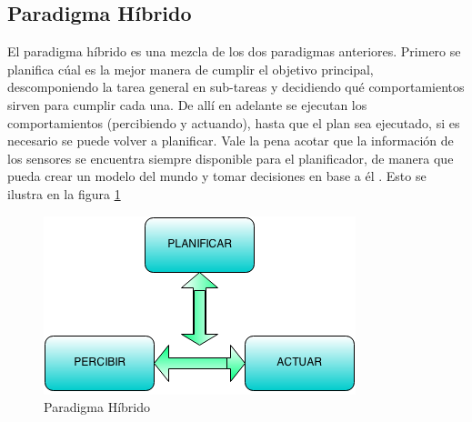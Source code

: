 \subsection{Paradigma Híbrido}
El paradigma híbrido es una mezcla de los dos paradigmas anteriores. Primero se planifica cúal es la mejor manera de cumplir el objetivo principal, descomponiendo la tarea general en sub-tareas y decidiendo qué comportamientos sirven para cumplir cada una. De allí en adelante se ejecutan los comportamientos (percibiendo y actuando), hasta que el plan sea ejecutado, si es necesario se puede volver a planificar. Vale la pena acotar que la información de los sensores se encuentra siempre disponible para el planificador, de manera que pueda crear un modelo del mundo y tomar decisiones en base a él  \cite{AiRobotics}. Esto se ilustra en la figura \ref{fig:hibrido}
\begin{figure}[hbtp]

\centering
\includegraphics[scale=0.7]{imagenes/hibrido.png} 
\caption{Paradigma H\'ibrido}
\label{fig:hibrido}
\end{figure}
